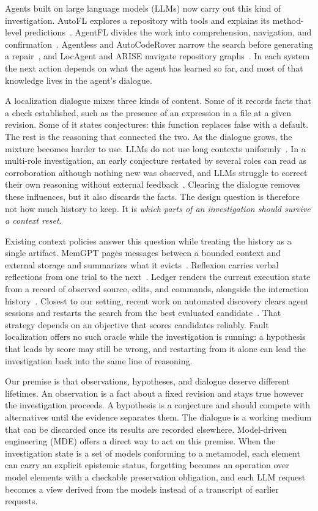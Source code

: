 \documentclass[letterpaper,journal]{IEEEtran}
\begin{document}
Agents built on large language models (LLMs) now carry out this kind of investigation. AutoFL explores a repository with tools and explains its method-level predictions~\cite{autofl2024}. AgentFL divides the work into comprehension, navigation, and confirmation~\cite{agentfl2024}. Agentless and AutoCodeRover narrow the search before generating a repair~\cite{agentless2025,autocoderover2024}, and LocAgent and ARISE navigate repository graphs~\cite{locagent2025,arise2026}. In each system the next action depends on what the agent has learned so far, and most of that knowledge lives in the agent's dialogue.

A localization dialogue mixes three kinds of content. Some of it records facts that a check established, such as the presence of an expression in a file at a given revision. Some of it states conjectures: this function replaces false with a default. The rest is the reasoning that connected the two. As the dialogue grows, the mixture becomes harder to use. LLMs do not use long contexts uniformly~\cite{lostmiddle2024}. In a multi-role investigation, an early conjecture restated by several roles can read as corroboration although nothing new was observed, and LLMs struggle to correct their own reasoning without external feedback~\cite{selfcorrect2024}. Clearing the dialogue removes these influences, but it also discards the facts. The design question is therefore not how much history to keep. It is \emph{which parts of an investigation should survive a context reset}.

Existing context policies answer this question while treating the history as a single artifact. MemGPT pages messages between a bounded context and external storage and summarizes what it evicts~\cite{memgpt2024}. Reflexion carries verbal reflections from one trial to the next~\cite{reflexion2023}. Ledger renders the current execution state from a record of observed source, edits, and commands, alongside the interaction history~\cite{ledger2026}. Closest to our setting, recent work on automated discovery clears agent sessions and restarts the search from the best evaluated candidate~\cite{forgetting2026}. That strategy depends on an objective that scores candidates reliably. Fault localization offers no such oracle while the investigation is running: a hypothesis that leads by score may still be wrong, and restarting from it alone can lead the investigation back into the same line of reasoning.

Our premise is that observations, hypotheses, and dialogue deserve different lifetimes. An observation is a fact about a fixed revision and stays true however the investigation proceeds. A hypothesis is a conjecture and should compete with alternatives until the evidence separates them. The dialogue is a working medium that can be discarded once its results are recorded elsewhere. Model-driven engineering (MDE) offers a direct way to act on this premise. When the investigation state is a set of models conforming to a metamodel, each element can carry an explicit epistemic status, forgetting becomes an operation over model elements with a checkable preservation obligation, and each LLM request becomes a view derived from the models instead of a transcript of earlier requests.
\end{document}
